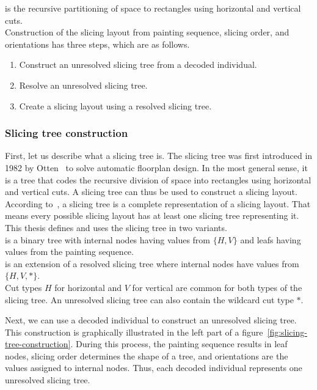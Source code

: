  is the recursive partitioning of space to rectangles using horizontal and vertical cuts.\\

Construction of the slicing layout from painting sequence, slicing order, and orientations has three steps, which are as follows.

\begin{enumerate}
    \item Construct an unresolved slicing tree from a decoded individual.
    \item Resolve an unresolved slicing tree.
    \item Create a slicing layout using a resolved slicing tree.
\end{enumerate}

\subsubsection*{Slicing tree construction}

First, let us describe what a slicing tree is.
The slicing tree was first introduced in 1982 by Otten~\cite{ottenAutomaticFloorplanDesign1982} to solve automatic floorplan design.
In the most general sense, it is a tree that codes the recursive division of space into rectangles using horizontal and vertical cuts.
A slicing tree can thus be used to construct a slicing layout.
According to~\cite{laiSlicingTreeComplete2001}, a slicing tree is a complete representation of a slicing layout.
That means every possible slicing layout has at least one slicing tree representing it.
This thesis defines and uses the slicing tree in two variants.\\

 is a binary tree with internal nodes having values from $\{H, V\}$
and leafs having values from the painting sequence.\\

 is an extension of a resolved slicing tree where internal nodes have values from $\{H, V, *\}$. \\

Cut types $H$ for horizontal and $V$ for vertical are common for both types of the slicing tree.
An unresolved slicing tree can also contain the wildcard cut type $*$.

Next, we can use a decoded individual to construct an unresolved slicing tree.
This construction is graphically illustrated in the left part of a figure~\ref{fig:slicing-tree-construction}.
During this process, the painting sequence results in leaf nodes, slicing order determines the shape of a tree, and orientations are the values assigned to internal nodes.
Thus, each decoded individual represents one unresolved slicing tree.

